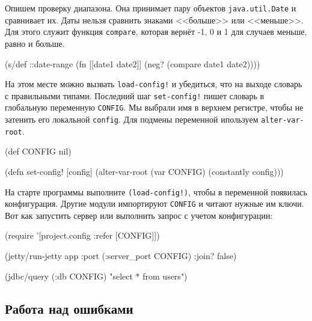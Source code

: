 
Опишем проверку диапазона. Она принимает пару объектов \verb|java.util.Date| и
сравнивает их. Даты нельзя сравнить знаками <<больше>> или <<меньше>>. Для этого
служит функция \verb|compare|, которая вернёт -1, 0 и 1 для случаев меньше,
равно и больше.

\begin{english}
  \begin{clojure}
(s/def ::date-range
  (fn [[date1 date2]]
    (neg? (compare date1 date2))))
  \end{clojure}
\end{english}

На этом месте можно вызвать \verb|load-config!| и убедиться, что на выходе
словарь с правильными типами. Последний шаг \verb|set-config!| пишет словарь в
глобальную переменную \verb|CONFIG|. Мы выбрали имя в верхнем регистре, чтобы не
затенить его локальной \verb|config|. Для подмены переменной ипользуем
\verb|alter-var-root|.


\begin{english}
  \begin{clojure}
(def CONFIG nil)

(defn set-config!
  [config]
  (alter-var-root (var CONFIG) (constantly config)))
  \end{clojure}
\end{english}

На старте программы выполните \verb|(load-config!)|, чтобы в переменной
появилась конфигурация. Другие модули импортируют \verb|CONFIG| и читают
нужные им ключи. Вот как запустить сервер или выполнить запрос с учетом
конфигурации:


\begin{english}
  \begin{clojure}
(require '[project.config :refer [CONFIG]])

(jetty/run-jetty app {:port (:server_port CONFIG)
                      :join? false})

(jdbc/query (:db CONFIG) "select * from users")
  \end{clojure}
\end{english}

\subsection{Работа над ошибками}

